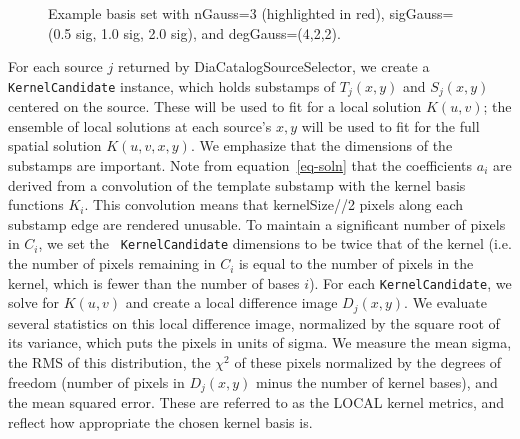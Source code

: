 \documentclass[prd, nofootinbib, floatfix, 11pt,tightenlines,times]{article}
\begin{document}
\begin{figure}
\caption{Example basis set with nGauss=3 (highlighted in red),
  sigGauss=(0.5 sig, 1.0 sig, 2.0 sig), and degGauss=(4,2,2).}
\label{basis}
\end{figure}

For each source $j$ returned by DiaCatalogSourceSelector, we create a
{\tt KernelCandidate} instance, which holds substamps of $T_j(x,y)$
and $S_j(x,y)$ centered on the source.  These will be used to fit for
a local solution $K(u,v)$; the ensemble of local solutions at each
source's $x,y$ will be used to fit for the full spatial solution
$K(u,v,x,y)$.  We emphasize that the dimensions of the substamps are
important.  Note from equation~\ref{eq-soln} that the coefficients
$a_i$ are derived from a convolution of the template substamp with the
kernel basis functions $K_i$.  This convolution means that
kernelSize//2 pixels along each substamp edge are rendered unusable.
To maintain a significant number of pixels in $C_i$, we set the {\tt
  KernelCandidate} dimensions to be twice that of the kernel (i.e. the
number of pixels remaining in $C_i$ is equal to the number of pixels
in the kernel, which is fewer than the number of bases $i$).  For each
{\tt KernelCandidate}, we solve for $K(u,v)$ and create a local
difference image $D_j(x,y)$.  We evaluate several statistics on this
local difference image, normalized by the square root of its variance,
which puts the pixels in units of sigma.  We measure the mean sigma,
the RMS of this distribution, the $\chi^2$ of these pixels normalized
by the degrees of freedom (number of pixels in $D_j(x,y)$ minus the
number of kernel bases), and the mean squared error.  These are
referred to as the LOCAL kernel metrics, and reflect how appropriate
the chosen kernel basis is.
\end{document}
